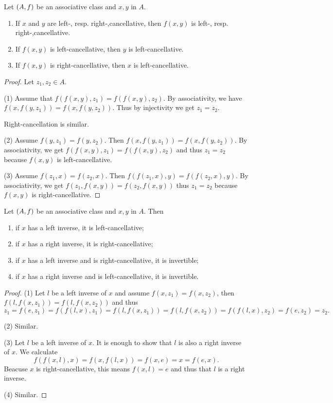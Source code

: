 \begin{lemma}
Let $\left( A, f \right)$ be an associative class and $x,y$ in $A$.
\begin{enumerate}
\item If $x$ and $y$ are left-, resp. right-,cancellative, then $f(x,y)$ is left-, resp. right-,cancellative.
\item If $f(x,y)$ is left-cancellative, then $y$ is left-cancellative.
\item If $f(x,y)$ is right-cancellative, then $x$ is left-cancellative.
\end{enumerate}
\end{lemma}
\begin{proof}
Let $z_1, z_2\in A$.

(1) Assume that $f(f(x,y), z_1) = f(f(x,y), z_2)$. By associativity, we have $f(x,f(y, z_1)) = f(x,f(y, z_2))$. Thus by injectivity we get $z_1 = z_2$.

Right-cancellation is similar.

(2) Assume $f(y,z_1) = f(y,z_2)$. Then $f(x, f(y,z_1)) = f(x, f(y,z_2))$. By associativity, we get $f(f(x,y), z_1) = f(f(x,y), z_2)$ and thus $z_1 = z_2$ because $f(x,y)$ is left-cancellative.

(3) Assume $f(z_1, x) = f(z_2, x)$. Then $f(f(z_1, x), y) = f(f(z_2, x), y)$. By associativity, we get $f(z_1, f(x,y)) = f(z_2, f(x,y))$ thus $z_1 = z_2$ because $f(x,y)$ is right-cancellative.
\end{proof}

\begin{lemma}
Let $\left( A, f \right)$ be an associative class and $x,y$ in $A$. Then
\begin{enumerate}
\item if $x$ has a left inverse, it is left-cancellative;
\item if $x$ has a right inverse, it is right-cancellative;
\item if $x$ has a left inverse and is right-cancellative, it is invertible;
\item if $x$ has a right inverse and is left-cancellative, it is invertible.
\end{enumerate}
\end{lemma}
\begin{proof}
(1) Let $l$ be a left inverse of $x$ and assume $f(x, z_1) = f(x,z_2)$, then $f(l, f(x,z_1)) = f(l, f(x,z_2))$ and thus
\[ z_1 = f(e,z_1) = f(f(l,x), z_1) = f(l, f(x,z_1)) = f(l, f(x,z_2)) = f(f(l,x), z_2) = f(e,z_2) = z_2. \]

(2) Similar.

(3) Let $l$ be a left inverse of $x$. It is enough to show that $l$ is also a right inverse of $x$. We calculate
\[ f(f(x,l), x) = f(x, f(l,x)) = f(x, e) = x = f(e,x). \]
Beacuse $x$ is right-cancellative, this means $f(x,l) = e$ and thus that $l$ is a right inverse.

(4) Similar.
\end{proof}


